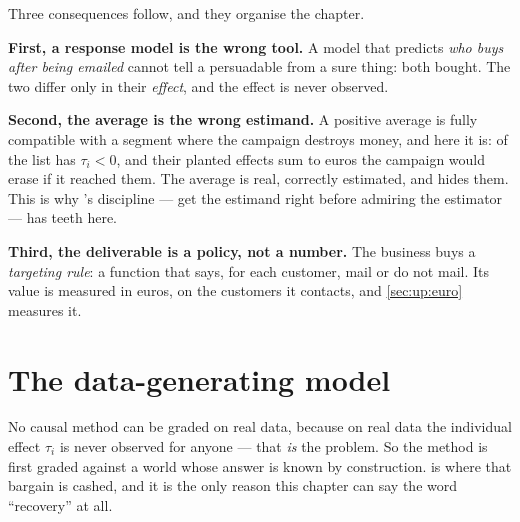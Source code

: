 Three consequences follow, and they organise the chapter.

\textbf{First, a response model is the wrong tool.} A model that predicts \emph{who buys after being
emailed} cannot tell a persuadable from a sure thing: both bought. The two differ only in their
\emph{effect}, and the effect is never observed.

\textbf{Second, the average is the wrong estimand.} A positive average is fully compatible with a
segment where the campaign destroys money, and here it is: \pc{\nbOneShareSleeping} of the list has
$\tau_i < 0$, and their planted effects sum to \nbOneSleepingLoss{} euros the campaign would erase if
it reached them. The \eur{\nbOneTrueAte} average is real, correctly estimated, and hides them. This is
why 's discipline --- get the estimand right before admiring the estimator --- has teeth
here.

\textbf{Third, the deliverable is a policy, not a number.} The business buys a \emph{targeting rule}:
a function that says, for each customer, mail or do not mail. Its value is measured in euros, on the
customers it contacts, and \cref{sec:up:euro} measures it.

\section{The data-generating model}
\label{sec:up:dgm}

No causal method can be graded on real data, because on real data the individual effect
$\tau_i$ is never observed for anyone --- that \emph{is} the problem. So the method is first
graded against a world whose answer is known by construction.  is where that
bargain is cashed, and it is the only reason this chapter can say the word ``recovery'' at all.

